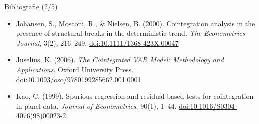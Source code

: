 \begin{frame}{Bibliografie (2/5)}
\begin{itemize}
    \item Johansen, S., Mosconi, R., \& Nielsen, B. (2000). Cointegration analysis in the presence of structural breaks in the deterministic trend. \textit{The Econometrics Journal}, 3(2), 216--249. \href{https://doi.org/10.1111/1368-423X.00047}{doi:10.1111/1368-423X.00047}
    \item Juselius, K. (2006). \textit{The Cointegrated VAR Model: Methodology and Applications}. Oxford University Press. \href{https://doi.org/10.1093/oso/9780199285662.001.0001}{doi:10.1093/oso/9780199285662.001.0001}
    \item Kao, C. (1999). Spurious regression and residual-based tests for cointegration in panel data. \textit{Journal of Econometrics}, 90(1), 1--44. \href{https://doi.org/10.1016/S0304-4076(98)00023-2}{doi:10.1016/S0304-4076(98)00023-2}
\end{itemize}
\end{frame}

